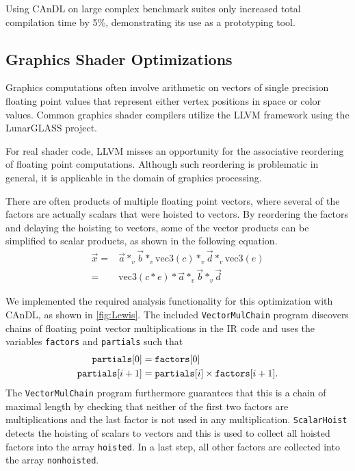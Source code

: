     Using CAnDL  on large complex benchmark suites only increased total
    compilation time by 5\%, demonstrating its use as a prototyping tool.

\subsection{Graphics Shader Optimizations}

    Graphics computations often involve arithmetic on vectors of single
    precision floating point values that represent either vertex positions in
    space or color values.
    Common graphics shader compilers utilize the LLVM framework using the
    LunarGLASS project.

    For real shader code, LLVM misses an opportunity for the associative
    reordering of floating point computations.
    Although such reordering is problematic in general, it is applicable in the
    domain of graphics processing.

    There are often products of multiple floating point vectors, where several
    of the factors are actually scalars that were hoisted to vectors.
    By reordering the factors and delaying the hoisting to vectors, some of the
    vector products can be simplified to scalar products, as shown in the
    following equation.
    \begin{align*}
        \vec x={}&\vec a*_v\vec b*_v\text{vec3}(c)*_v\vec d*_v\text{vec3}(e)\\
        ={}&\text{vec3}(c*e)*\vec a*_v\vec b*_v\vec d
    \end{align*}

    We implemented the required analysis functionality for this optimization
    with CAnDL, as shown in \autoref{fig:Lewis}.
    The \mbox{included} \texttt{VectorMulChain} program discovers chains of
    floating point vector multiplications in the IR code and uses the variables
    \texttt{factors} and \texttt{partials} such that
    \begin{align*}
        \text{\tt partials}[0] &= \text{\tt factors}[0]\\
        \text{\tt partials}[i+1] &= \text{\tt partials}[i]\times\text{\tt factors}[i+1].
    \end{align*}
    The \texttt{VectorMulChain} program furthermore guarantees that this is a
    chain of maximal length by checking that neither of the first two factors
    are multiplications and the last factor is not used in any multiplication.
    \texttt{ScalarHoist} detects the hoisting of scalars to vectors and this is
    used to collect all hoisted factors into the array \texttt{hoisted}.
    In a last step, all other factors are collected into the array
    \texttt{nonhoisted}.

